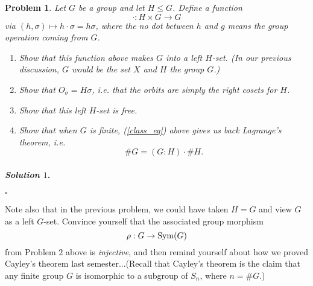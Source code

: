 \documentclass[reqno]{amsart}
\theoremstyle{plain}
\newtheorem{problem}{Problem}
\theoremstyle{definition}
\newenvironment{solution1}{\paragraph{\emph{Solution $1$}.}}{\hfill$\square$}
\begin{document}
\begin{problem}
Let $G$ be a group and let $H \le G$.  Define a function 
$$\cdot: H \times G \rightarrow G $$
via $(h,\sigma) \mapsto h \cdot \sigma = h \sigma$, where the no dot between $h$ and $g$ means the group operation coming from $G$.
\begin{enumerate}[label=(\alph*)]
\item Show that this function above makes $G$ into a left $H$-set.  (In our previous discussion, $G$ would be the set $X$ and $H$ the group $G$.)
\item Show that $O_{\sigma} = H\sigma$, i.e. that the orbits are simply the right cosets for $H$.
\item Show that this left $H$-set is free.
\item Show that when $G$ is finite, (\ref{class_eq}) above gives us back Lagrange's theorem, i.e.
$$\# G = (G:H) \cdot \#H. $$
\end{enumerate}
\end{problem}
\begin{solution1}

\end{solution1}

Note also that in the previous problem, we could have taken $H = G$ and view $G$ as a left $G$-set.  Convince yourself that the associated group morphism
\begin{equation} \label{cayley}
\rho:G \rightarrow {\rm Sym}(G) 
\end{equation}
from Problem $2$ above is \emph{injective}, and then remind yourself about how we proved Cayley's theorem last semester...(Recall that Cayley's theorem is the claim that any finite group $G$ is isomorphic to a subgroup of $S_{n}$, where $n = \# G$.)
\end{document}
